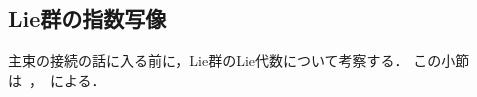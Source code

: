 \documentclass[TQFT_main]{subfiles}
\begin{document}


	


\subsection{Lie群の指数写像}

主束の接続の話に入る前に，Lie群のLie代数について考察する．
この小節は~\cite[Chapter 20]{Lee2012smooth}，~\cite[第6章]{Imai2013diff}による．
\end{document}
